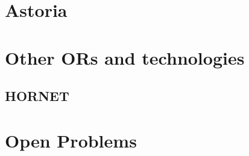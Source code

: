 \section{Astoria}
\section{Other ORs and technologies}
\subsection{HORNET}

\section{Open Problems}
